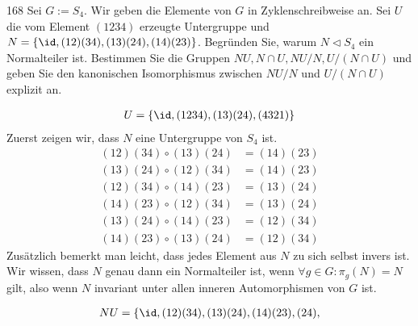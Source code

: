 \begin{algebraUE}{168}
Sei $G := S_4$. Wir geben die Elemente von $G$ in Zyklenschreibweise an. Sei
$U$ die vom Element $(1234)$ erzeugte Untergruppe und $N = \{\id, (12)(34),(13)(24),(14)(23)\}$.
Begründen Sie, warum $N \vartriangleleft S_4$ ein Normalteiler ist. Bestimmen
Sie die Gruppen $NU, N\cap U, NU/N, U/(N \cap U)$ und geben Sie den kanonischen
Isomorphismus zwischen $NU/N$ und $U/(N \cap U)$ explizit an.
\end{algebraUE}
\begin{solution}
\begin{align*}
  U = \{\id, (1234),(13)(24),(4321)\}
\end{align*}
Zuerst zeigen wir, dass $N$ eine Untergruppe von $S_4$ ist.
\begin{align*}
  (12)(34) \circ (13)(24) &= (14)(23) \\
  (13)(24) \circ (12)(34) &= (14)(23) \\
  (12)(34) \circ (14)(23) &= (13)(24) \\
  (14)(23) \circ (12)(34) &= (13)(24) \\
  (13)(24) \circ (14)(23) &= (12)(34) \\
  (14)(23) \circ (13)(24) &= (12)(34)
\end{align*}
Zusätzlich bemerkt man leicht, dass jedes Element aus $N$ zu sich selbst invers ist.
Wir wissen, dass $N$ genau dann ein Normalteiler ist, wenn $\forall g \in G: \pi_g(N) = N$ gilt,
also wenn $N$ invariant unter allen inneren Automorphismen von $G$ ist.

\begin{align*}
  NU = \{\id,(12)(34),(13)(24),(14)(23),(24),
\end{align*}
\end{solution}
